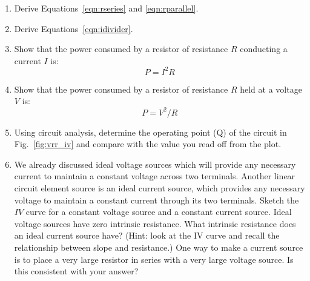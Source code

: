 \documentclass[12pt,oneside]{book}
\begin{document}
\begin{enumerate}

\item Derive Equations~\ref{eqn:rseries} and \ref{eqn:rparallel}.

\item Derive Equations~\ref{eqn:idivider}.

\item Show that the power consumed by a resistor of resistance $R$ conducting a current $I$ is:
\begin{displaymath}
P = I^2R
\end{displaymath}

\item Show that the power consumed by a resistor of resistance $R$ held at a voltage $V$ is:
\begin{displaymath}
P = V^2/R
\end{displaymath}

\item Using circuit analysis, determine the operating point (Q) of the
  circuit in Fig.~\ref{fig:vrr_iv} and compare with the value you read
  off from the plot.



\item We already discussed ideal voltage sources which will provide
  any necessary current to maintain a constant voltage across two
  terminals.  Another linear circuit element source is an ideal
  current source, which provides any necessary voltage to maintain a
  constant current through its two terminals.  Sketch the $IV$ curve
  for a constant voltage source and a constant current source.  Ideal
  voltage sources have zero intrinsic resistance.  What intrinsic
  resistance does an ideal current source have?  (Hint: look at the IV
  curve and recall the relationship between slope and resistance.)
  One way to make a current source is to place a very large resistor
  in series with a very large voltage source.  Is this consistent with
  your answer?



\end{enumerate}
\end{document}
